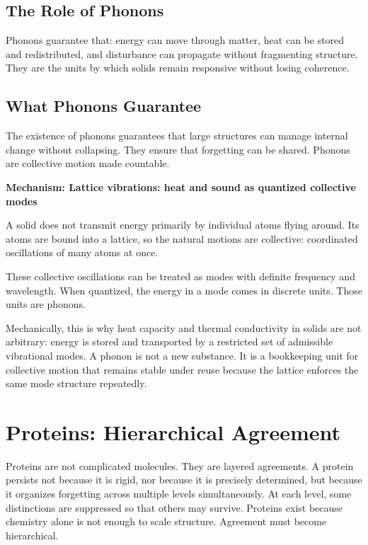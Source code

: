 \documentclass[11pt,twoside,openright]{book}
\newenvironment{mechanismbox}[1]
  {\begin{framed}\noindent\textbf{Mechanism: #1}\par\medskip}
  {\end{framed}}
\begin{document}
\section*{The Role of Phonons}

Phonons guarantee that: energy can move through matter, heat can be stored and redistributed, and disturbance can propagate without fragmenting structure. They are the units by which solids remain responsive without losing coherence.

\section*{What Phonons Guarantee}

The existence of phonons guarantees that large structures can manage internal change without collapsing. They ensure that forgetting can be shared. Phonons are collective motion made countable.

\begin{mechanismbox}{Lattice vibrations: heat and sound as quantized collective modes}
A solid does not transmit energy primarily by individual atoms flying around.
Its atoms are bound into a lattice, so the natural motions are collective: coordinated oscillations of many atoms at once.

These collective oscillations can be treated as modes with definite frequency and wavelength. When quantized, the energy in a mode comes in discrete units. Those units are phonons.

Mechanically, this is why heat capacity and thermal conductivity in solids are not arbitrary:
energy is stored and transported by a restricted set of admissible vibrational modes.
A phonon is not a new substance.
It is a bookkeeping unit for collective motion that remains stable under reuse because the lattice enforces the same mode structure repeatedly.
\end{mechanismbox}
\chapter{Proteins: Hierarchical Agreement}

Proteins are not complicated molecules. They are layered agreements. A protein persists not because it is rigid, nor because it is precisely determined, but because it organizes forgetting across multiple levels simultaneously. At each level, some distinctions are suppressed so that others may survive. Proteins exist because chemistry alone is not enough to scale structure. Agreement must become hierarchical.
\end{document}
